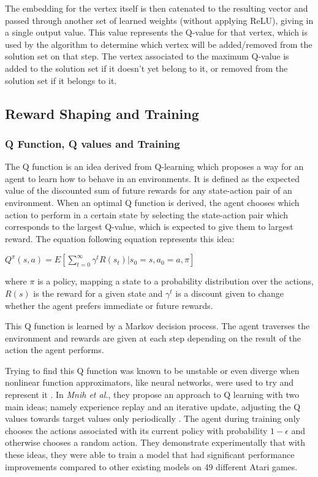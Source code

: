 \documentclass{article}
\begin{document}
The embedding for the vertex itself is then catenated to the resulting vector and passed through another set of learned weights (without applying ReLU), giving in a single output value. This value represents the Q-value for that vertex, which is used by the algorithm to determine which vertex will be added/removed from the solution set on that step. The vertex associated to the maximum Q-value is added to the solution set if it doesn't yet belong to it, or removed from the solution set if it belongs to it.

\subsection{Reward Shaping and Training}

\subsubsection{Q Function, Q values and Training}

The Q function is an idea derived from Q-learning \cite{qlearning} which proposes a way for an agent to learn how to behave in an environments. It is defined as the expected value of the discounted sum of future rewards for any state-action pair of an environment. When an optimal Q function is derived, the agent chooses which action to perform in a certain state by selecting the state-action pair which corresponds to the largest Q-value, which is expected to give them to largest reward. The equation following equation represents this idea:
 
$Q^\pi(s, a) = E[\sum_{t=0}^{\infty} \gamma^t R(s_t) | s_0 = s, a_0 = a, \pi]$

where $\pi$ is a policy, mapping a state to a probability distribution over the actions, $R(s)$ is the reward for a given state and $\gamma^t$ is a discount given to change whether the agent prefers immediate or future rewards.

This Q function is learned by a Markov decision process. The agent traverses the environment and rewards are given at each step depending on the result of the action the agent performs.

Trying to find this Q function was known to be unstable or even diverge when nonlinear function approximators, like neural networks, were used to try and represent it \cite{td-func-approx}. In \textit{Mnih et al.}, they propose an approach to Q learning with two main ideas; namely experience replay and an iterative update, adjusting the Q values towards target values only periodically \cite{deepmind_2015}. The agent during training only chooses the actions associated with its current policy with probability $1 - \epsilon$ and otherwise chooses a random action. They demonstrate experimentally that with these ideas, they were able to train a model that had significant performance improvements compared to other existing models on 49 different Atari games.
\end{document}
